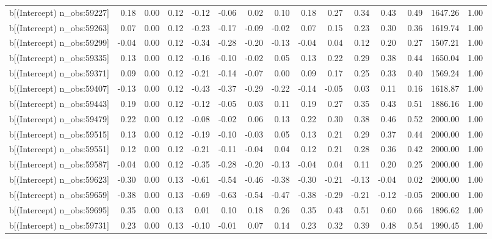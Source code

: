 \begin{table}[ht]
\begin{tabular}{rrrrrrrrrrrrrrr}
  b[(Intercept) n\_obs:59227] & 0.18 & 0.00 & 0.12 & -0.12 & -0.06 & 0.02 & 0.10 & 0.18 & 0.27 & 0.34 & 0.43 & 0.49 & 1647.26 & 1.00 \\ 
  b[(Intercept) n\_obs:59263] & 0.07 & 0.00 & 0.12 & -0.23 & -0.17 & -0.09 & -0.02 & 0.07 & 0.15 & 0.23 & 0.30 & 0.36 & 1619.74 & 1.00 \\ 
  b[(Intercept) n\_obs:59299] & -0.04 & 0.00 & 0.12 & -0.34 & -0.28 & -0.20 & -0.13 & -0.04 & 0.04 & 0.12 & 0.20 & 0.27 & 1507.21 & 1.00 \\ 
  b[(Intercept) n\_obs:59335] & 0.13 & 0.00 & 0.12 & -0.16 & -0.10 & -0.02 & 0.05 & 0.13 & 0.22 & 0.29 & 0.38 & 0.44 & 1650.04 & 1.00 \\ 
  b[(Intercept) n\_obs:59371] & 0.09 & 0.00 & 0.12 & -0.21 & -0.14 & -0.07 & 0.00 & 0.09 & 0.17 & 0.25 & 0.33 & 0.40 & 1569.24 & 1.00 \\ 
  b[(Intercept) n\_obs:59407] & -0.13 & 0.00 & 0.12 & -0.43 & -0.37 & -0.29 & -0.22 & -0.14 & -0.05 & 0.03 & 0.11 & 0.16 & 1618.87 & 1.00 \\ 
  b[(Intercept) n\_obs:59443] & 0.19 & 0.00 & 0.12 & -0.12 & -0.05 & 0.03 & 0.11 & 0.19 & 0.27 & 0.35 & 0.43 & 0.51 & 1886.16 & 1.00 \\ 
  b[(Intercept) n\_obs:59479] & 0.22 & 0.00 & 0.12 & -0.08 & -0.02 & 0.06 & 0.13 & 0.22 & 0.30 & 0.38 & 0.46 & 0.52 & 2000.00 & 1.00 \\ 
  b[(Intercept) n\_obs:59515] & 0.13 & 0.00 & 0.12 & -0.19 & -0.10 & -0.03 & 0.05 & 0.13 & 0.21 & 0.29 & 0.37 & 0.44 & 2000.00 & 1.00 \\ 
  b[(Intercept) n\_obs:59551] & 0.12 & 0.00 & 0.12 & -0.21 & -0.11 & -0.04 & 0.04 & 0.12 & 0.21 & 0.28 & 0.36 & 0.42 & 2000.00 & 1.00 \\ 
  b[(Intercept) n\_obs:59587] & -0.04 & 0.00 & 0.12 & -0.35 & -0.28 & -0.20 & -0.13 & -0.04 & 0.04 & 0.11 & 0.20 & 0.25 & 2000.00 & 1.00 \\ 
  b[(Intercept) n\_obs:59623] & -0.30 & 0.00 & 0.13 & -0.61 & -0.54 & -0.46 & -0.38 & -0.30 & -0.21 & -0.13 & -0.04 & 0.02 & 2000.00 & 1.00 \\ 
  b[(Intercept) n\_obs:59659] & -0.38 & 0.00 & 0.13 & -0.69 & -0.63 & -0.54 & -0.47 & -0.38 & -0.29 & -0.21 & -0.12 & -0.05 & 2000.00 & 1.00 \\ 
  b[(Intercept) n\_obs:59695] & 0.35 & 0.00 & 0.13 & 0.01 & 0.10 & 0.18 & 0.26 & 0.35 & 0.43 & 0.51 & 0.60 & 0.66 & 1896.62 & 1.00 \\ 
  b[(Intercept) n\_obs:59731] & 0.23 & 0.00 & 0.13 & -0.10 & -0.01 & 0.07 & 0.14 & 0.23 & 0.32 & 0.39 & 0.48 & 0.54 & 1990.45 & 1.00 \\ 

\end{tabular}
\end{table}
